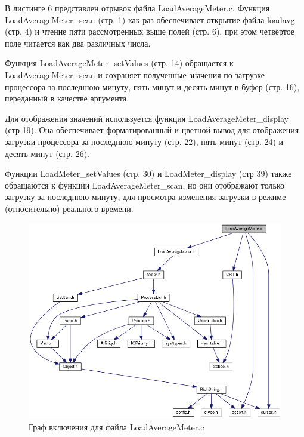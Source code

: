 \documentclass[a4paper, 12pt]{article}		%
\begin{document}
В листинге 6 представлен отрывок файла LoadAverageMeter.c. Функция LoadAverageMeter\_scan (стр. 1) как раз обеспечивает открытие файла loadavg (стр. 4) и чтение пяти рассмотренных выше полей (стр. 6), при этом четвёртое поле читается как два различных числа.

Функция LoadAverageMeter\_setValues (стр. 14) обращается к LoadAverageMeter\_scan и сохраняет полученные значения по загрузке процессора за последнюю минуту, пять минут и десять минут в буфер (стр. 16), переданный в качестве аргумента.

Для отображения значений используется функция LoadAverageMeter\_display (стр 19). Она обеспечивает форматированный и цветной вывод для отображения загрузки процессора за последнюю минуту (стр. 22), пять минут (стр. 24) и десять минут (стр. 26).

Функции LoadMeter\_setValues (стр. 30) и LoadMeter\_display (стр 39) также обращаются к функции LoadAverageMeter\_scan, но они отображают только загрузку за последнюю минуту, для просмотра изменения загрузки в режиме (относительно) реального времени.

\newpage


\begin{figure}[h!]
\centering
\includegraphics[scale=0.55]{res/load_average_meter.png}
\caption{Граф включения для файла LoadAverageMeter.c}
\end{figure}

\newpage
\end{document}

